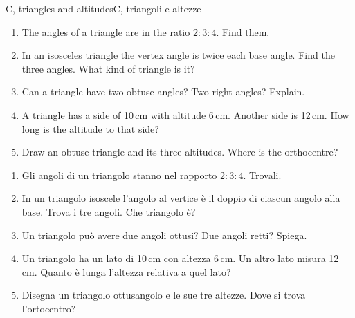 \begin{exercise}{C, triangles and altitudes}{C, triangoli e altezze}
\begin{enumerate}[label=\textbf{C\arabic*.}, leftmargin=2.2em]
\item The angles of a triangle are in the ratio $2 : 3 : 4$. Find them.
\item In an isosceles triangle the vertex angle is twice each base angle. Find the three angles. What kind of triangle is it?
\item Can a triangle have two obtuse angles? Two right angles? Explain.
\item A triangle has a side of 10\,cm with altitude 6\,cm. Another side is 12\,cm. How long is the altitude to that side?
\item Draw an obtuse triangle and its three altitudes. Where is the orthocentre?
\end{enumerate}
\tcblower
\begin{enumerate}[label=\textbf{C\arabic*.}, leftmargin=2.2em]
\item Gli angoli di un triangolo stanno nel rapporto $2 : 3 : 4$. Trovali.
\item In un triangolo isoscele l'angolo al vertice è il doppio di ciascun angolo alla base. Trova i tre angoli. Che triangolo è?
\item Un triangolo può avere due angoli ottusi? Due angoli retti? Spiega.
\item Un triangolo ha un lato di 10\,cm con altezza 6\,cm. Un altro lato misura 12\,cm. Quanto è lunga l'altezza relativa a quel lato?
\item Disegna un triangolo ottusangolo e le sue tre altezze. Dove si trova l'ortocentro?
\end{enumerate}
\end{exercise}

